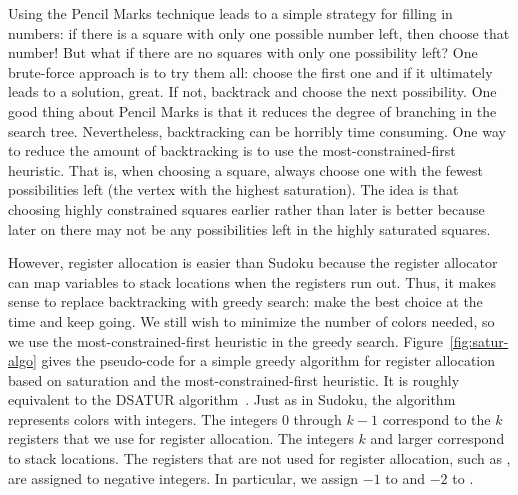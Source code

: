 \documentclass[11pt]{book}
\begin{document}
Using the Pencil Marks technique leads to a simple strategy for
filling in numbers: if there is a square with only one possible number
left, then choose that number! But what if there are no squares with
only one possibility left? One brute-force approach is to try them
all: choose the first one and if it ultimately leads to a solution,
great.  If not, backtrack and choose the next possibility.  One good
thing about Pencil Marks is that it reduces the degree of branching in
the search tree. Nevertheless, backtracking can be horribly time
consuming. One way to reduce the amount of backtracking is to use the
most-constrained-first heuristic. That is, when choosing a square,
always choose one with the fewest possibilities left (the vertex with
the highest saturation).  The idea is that choosing highly constrained
squares earlier rather than later is better because later on there may
not be any possibilities left in the highly saturated squares.

However, register allocation is easier than Sudoku because the
register allocator can map variables to stack locations when the
registers run out. Thus, it makes sense to replace backtracking with
greedy search: make the best choice at the time and keep going. We
still wish to minimize the number of colors needed, so we use the
most-constrained-first heuristic in the greedy search.
Figure~\ref{fig:satur-algo} gives the pseudo-code for a simple greedy
algorithm for register allocation based on saturation and the
most-constrained-first heuristic. It is roughly equivalent to the
DSATUR
algorithm~\citep{Brelaz:1979eu,Gebremedhin:1999fk,Omari:2006uq}.  Just
as in Sudoku, the algorithm represents colors with integers. The
integers $0$ through $k-1$ correspond to the $k$ registers that we use
for register allocation. The integers $k$ and larger correspond to
stack locations. The registers that are not used for register
allocation, such as , are assigned to negative integers. In
particular, we assign $-1$ to  and $-2$ to .

\end{document}
